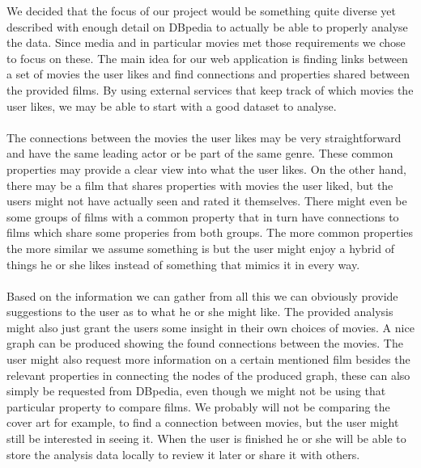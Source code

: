 We decided that the focus of our project would be something quite diverse yet described with enough detail on DBpedia to actually be able to properly analyse the data. Since media and in particular movies met those requirements we chose to focus on these. The main idea for our web application is finding links between a set of movies the user likes and find connections and properties shared between the provided films. By using external services that keep track of which movies the user likes, we may be able to start with a good dataset to analyse.

\paragraph {}
The connections between the movies the user likes may be very straightforward and have the same leading actor or be part of the same genre. These common properties may provide a clear view into what the user likes. On the other hand, there may be a film that shares properties with movies the user liked, but the users might not have actually seen and rated it themselves. There might even be some groups of films with a common property that in turn have connections to films which share some properies from both groups. The more common properties the more similar we assume something is but the user might enjoy a hybrid of things he or she likes instead of something that mimics it in every way.

\paragraph {}
Based on the information we can gather from all this we can obviously provide suggestions to the user as to what he or she might like. The provided analysis might also just grant the users some insight in their own choices of movies. A nice graph can be produced showing the found connections between the movies. The user might also request more information on a certain mentioned film besides the relevant properties in connecting the nodes of the produced graph, these can also simply be requested from DBpedia, even though we might not be using that particular property to compare films. We probably will not be comparing the cover art for example, to find a connection between movies, but the user might still be interested in seeing it. When the user is finished he or she will be able to store the analysis data locally to review it later or share it with others.
